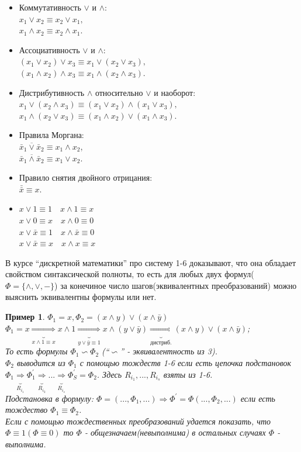 \documentclass{article}
\newtheorem{example}{Пример}
\numberwithin{example}{section}
\numberwithin{question}{section}
\numberwithin{Remark}{section}
\numberwithin{theorem}{section}
\numberwithin{definition}{section}
\numberwithin{proposition}{section}
\begin{document}
\begin{itemize}
	\item  Коммутативность $\vee$ и $\wedge$:\\
	$x_1\vee x_2\equiv x_2\vee x_1,$\\
	$x_1\wedge x_2\equiv x_2\wedge x_1$.
	\item Ассоциативность $\vee$ и $\wedge$:\\
	$(x_1\vee x_2)\vee x_3\equiv x_1\vee (x_2\vee x_3),$\\
	$(x_1\wedge x_2)\wedge x_3\equiv x_1\wedge (x_2\wedge x_3).$
	\item Дистрибутивность $\wedge$ относительно $\vee$ и наоборот:\\
	$x_1\vee (x_2\wedge x_3)\equiv (x_1\vee x_2)\wedge(x_1\vee x_3),$\\
	$x_1\wedge (x_2\vee x_3)\equiv (x_1\wedge x_2)\vee(x_1\wedge x_3).$
	\item Правила Моргана:\\
	$\overline{\bar{x}_1\vee \bar{x}_2}\equiv x_1\wedge x_2$,\\
	$\overline{\bar{x}_1\wedge \bar{x}_2}\equiv x_1\vee x_2$.
	\item Правило снятия двойного отрицания:\\
	$\bar{\bar{x}}\equiv x$.
	\item $x\vee 1\equiv 1\quad x\wedge 1\equiv x$\\
	$x\vee 0\equiv x\quad x\wedge 0\equiv 0$\\
	$x\vee \bar{x}\equiv 1\quad x\wedge \bar{x}\equiv 0$\\
	$x\vee\bar{x}\equiv x\quad x\wedge x\equiv x$
\end{itemize} 
	В курсе ``дискретной математики'' про систему 1-6 доказывают, что она обладает свойством синтаксической полноты, то есть для любых двух формул( $\Phi=\{\land,\lor,-\}$) за конечиное число шагов(эквивалентных преобразований) можно выяснить эквивалентны формулы или нет.
	\begin{example}
		$\Phi_1=x,  \Phi_2=(x\land y)\lor (x\land \bar{y})$\\
		$\Phi_1=x \underbrace{\Rightarrow}_{x\land 1\equiv x} x\land 1 \underbrace{\Rightarrow}_{y\lor \bar{y}\equiv 1}x\land(y\lor \bar{y})\underbrace{\Rightarrow}_{\text{дистриб.}} (x\land y)\lor (x\land \bar{y})$;\\
		То есть формулы $\Phi_1 \backsim \Phi_2$ (``$\backsim$'' - эквивалентность из 3).\\
		$\Phi_2$ выводится из $\Phi_1$ с помощью тождеств 1-6 если есть цепочка подстановок $\Phi_1\underbrace{\Rightarrow}_{R_{i_1}}\Phi_1^{'} \underbrace{\Rightarrow}_{R_{i_2}}...\underbrace{\Rightarrow}_{R_{i_s}}\Phi_S^{'}  =\Phi_2$. Здесь $R_{i_1},...,R_{i_s}$ взяты из 1-6.\\
	 	Подстановка в формулу: $\Phi =(...,\Phi_1 ,...)\Rightarrow \Phi^{'} =\Phi(...,\Phi_2 ,...)$ если есть тождество $\Phi_1\equiv \Phi_2$.\\
	 	Если с помощью тождественных преобразований удается показать, что $\Phi\equiv 1 (\Phi \equiv 0)$ то $\Phi$ - общезначаем(невыполнима) в остальных случаях $\Phi$ - выполнима.
	\end{example}
\end{document}
